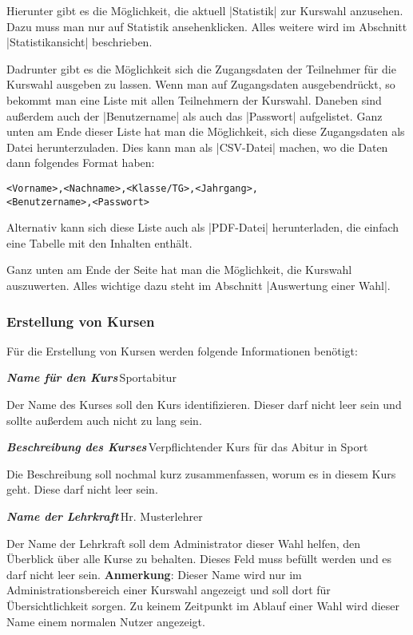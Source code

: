 \documentclass[ngerman]{ltxdoc}
\newcommand{\DescribeOption}[4]{
  \DescribeMacro{#1}
  \begin{minipage}[t]{\textwidth}
    \textit{\textbf{\textcolor{mLightGreen}{#2}}}\dotfill\,#3\par
    \begingroup
    \vspace{0.5em}#4\par
    \endgroup
  \end{minipage}
}
\begin{document}
Hierunter gibt es die Möglichkeit, die aktuell |Statistik| zur Kurswahl anzusehen.
Dazu muss man nur auf \glqq Statistik ansehen\grqq klicken. Alles weitere wird im
Abschnitt |Statistikansicht| beschrieben.

Dadrunter gibt es die Möglichkeit sich die Zugangsdaten der Teilnehmer für die
Kurswahl ausgeben zu lassen. Wenn man auf \glqq Zugangsdaten ausgeben\grqq drückt,
so bekommt man eine Liste mit allen Teilnehmern der Kurswahl. Daneben sind außerdem
auch der |Benutzername| als auch das |Passwort| aufgelistet. Ganz unten am Ende
dieser Liste hat man die Möglichkeit, sich diese Zugangsdaten als Datei herunterzuladen.
Dies kann man als |CSV-Datei| machen, wo die Daten dann folgendes Format haben:

\begin{lstlisting}[style=tex]
<Vorname>,<Nachname>,<Klasse/TG>,<Jahrgang>,
<Benutzername>,<Passwort>
\end{lstlisting}

Alternativ kann sich diese Liste auch als |PDF-Datei| herunterladen, die einfach
eine Tabelle mit den Inhalten enthält.

Ganz unten am Ende der Seite hat man die Möglichkeit, die Kurswahl auszuwerten.
Alles wichtige dazu steht im Abschnitt |Auswertung einer Wahl|.

\subsubsection{Erstellung von Kursen}

Für die Erstellung von Kursen werden folgende Informationen benötigt:

\DescribeOption{Kursname}{Name für den Kurs}{Sportabitur}{
  Der Name des Kurses soll den Kurs identifizieren. Dieser darf nicht leer sein
  und sollte außerdem auch nicht zu lang sein.
}

\DescribeOption{Beschreibung}{Beschreibung des Kurses}{Verpflichtender Kurs für das Abitur in Sport}{
  Die Beschreibung soll nochmal kurz zusammenfassen, worum es in diesem Kurs geht. Diese
  darf nicht leer sein.
}

\DescribeOption{Lehrkraft}{Name der Lehrkraft}{Hr. Musterlehrer}{
  Der Name der Lehrkraft soll dem Administrator dieser Wahl helfen, den Überblick
  über alle Kurse zu behalten. Dieses Feld muss befüllt werden und es darf nicht
  leer sein.
  \textbf{Anmerkung}: Dieser Name wird nur im Administrationsbereich einer Kurswahl
  angezeigt und soll dort für Übersichtlichkeit sorgen. Zu keinem Zeitpunkt im
  Ablauf einer Wahl wird dieser Name einem normalen Nutzer angezeigt.
}
\end{document}

